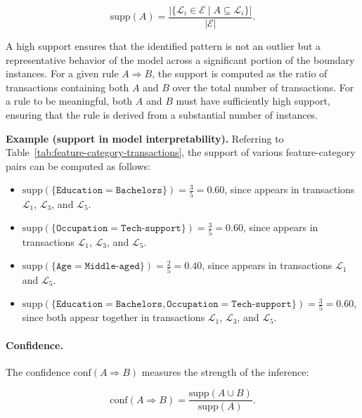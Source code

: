 \begin{equation}
  \mathrm{supp}(A) = \frac{|\{ \mathcal{L}_i \in \mathcal{E} \mid A \subseteq \mathcal{L}_i \}|}{|\mathcal{E}|}.
\end{equation}

A high support ensures that the identified pattern is not an outlier but a representative behavior of the model across a significant portion of the boundary instances. For a given rule $A \Rightarrow B$, the support is computed as the ratio of transactions containing both $A$ and $B$ over the total number of transactions. For a rule to be meaningful, both $A$ and $B$ must have sufficiently high support, ensuring that the rule is derived from a substantial number of instances.

\noindent\textbf{Example (support in model interpretability).} Referring to Table~\ref{tab:feature-category-transactions}, the support of various feature-category pairs can be computed as follows:

\begin{itemize}
  \item $\mathrm{supp}(\{\texttt{Education}=\texttt{Bachelors}\}) = \frac{3}{5} = 0.60$, since  appears in transactions $\mathcal{L}_1$, $\mathcal{L}_3$, and $\mathcal{L}_5$.
  \item $\mathrm{supp}(\{\texttt{Occupation}=\texttt{Tech-support}\}) = \frac{3}{5} = 0.60$, since  appears in transactions $\mathcal{L}_1$, $\mathcal{L}_3$, and $\mathcal{L}_5$.
  \item $\mathrm{supp}(\{\texttt{Age}=\texttt{Middle-aged}\}) = \frac{2}{5} = 0.40$, since  appears in transactions $\mathcal{L}_1$ and $\mathcal{L}_5$.
  \item $\mathrm{supp}(\{\texttt{Education}=\texttt{Bachelors}, \texttt{Occupation}=\texttt{Tech-support}\}) = \frac{3}{5} = 0.60$, since both appear together in transactions $\mathcal{L}_1$, $\mathcal{L}_3$, and $\mathcal{L}_5$.
\end{itemize}

\paragraph{Confidence.} The confidence $\mathrm{conf}(A \Rightarrow B)$ measures the strength of the inference:

\begin{equation}
  \mathrm{conf}(A \Rightarrow B) = \frac{\mathrm{supp}(A \cup B)}{\mathrm{supp}(A)}.
\end{equation}


